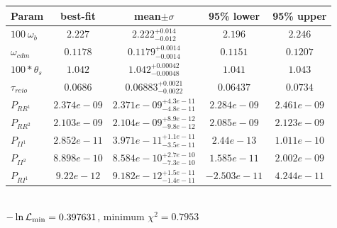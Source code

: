 \begin{tabular}{|l|c|c|c|c|} 
 \hline 
Param & best-fit & mean$\pm\sigma$ & 95\% lower & 95\% upper \\ \hline 
$100~\omega_{b }$ &$2.227$ & $2.222_{-0.012}^{+0.014}$ & $2.196$ & $2.246$ \\ 
$\omega_{cdm }$ &$0.1178$ & $0.1179_{-0.0014}^{+0.0014}$ & $0.1151$ & $0.1207$ \\ 
$100*\theta_{s }$ &$1.042$ & $1.042_{-0.00048}^{+0.00042}$ & $1.041$ & $1.043$ \\ 
$\tau_{reio }$ &$0.0686$ & $0.06883_{-0.0022}^{+0.0021}$ & $0.06437$ & $0.0734$ \\ 
$P_{{RR}^1 }$ &$2.374e-09$ & $2.371e-09_{-4.8e-11}^{+4.3e-11}$ & $2.284e-09$ & $2.461e-09$ \\ 
$P_{{RR}^2 }$ &$2.103e-09$ & $2.104e-09_{-9.8e-12}^{+8.9e-12}$ & $2.085e-09$ & $2.123e-09$ \\ 
$P_{{II}^1 }$ &$2.852e-11$ & $3.971e-11_{-3.5e-11}^{+1.1e-11}$ & $2.44e-13$ & $1.011e-10$ \\ 
$P_{{II}^2 }$ &$8.898e-10$ & $8.584e-10_{-7.3e-10}^{+2.7e-10}$ & $1.585e-11$ & $2.002e-09$ \\ 
$P_{{RI}^1 }$ &$9.22e-12$ & $9.182e-12_{-1.4e-11}^{+1.5e-11}$ & $-2.503e-11$ & $4.244e-11$ \\ 
\hline 
 \end{tabular} \\ 
$-\ln{\cal L}_\mathrm{min} =0.397631$, minimum $\chi^2=0.7953$ \\ 
